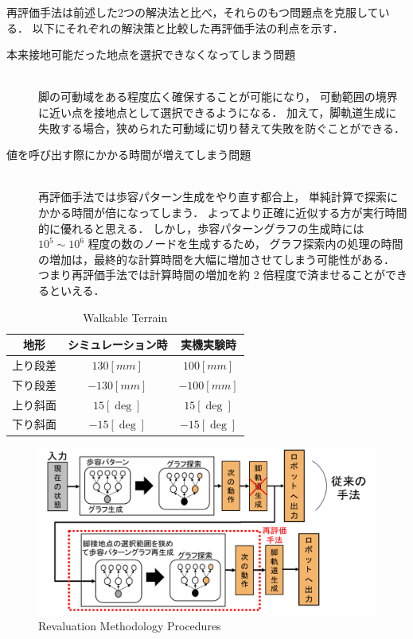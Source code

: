 再評価手法は前述した2つの解決法と比べ，それらのもつ問題点を克服している．
以下にそれぞれの解決策と比較した再評価手法の利点を示す．

\begin{description}
  \item[本来接地可能だった地点を選択できなくなってしまう問題]\mbox{}\\
    脚の可動域をある程度広く確保することが可能になり，
    可動範囲の境界に近い点を接地点として選択できるようになる．
    加えて，脚軌道生成に失敗する場合，狭められた可動域に切り替えて失敗を防ぐことができる．
    \\
  \item[値を呼び出す際にかかる時間が増えてしまう問題]\mbox{}\\
    再評価手法では歩容パターン生成をやり直す都合上，
    単純計算で探索にかかる時間が倍になってしまう．
    よってより正確に近似する方が実行時間的に優れると思える．
    しかし，歩容パターングラフの生成時には $10^5 \sim 10^6$ 程度の数のノードを生成するため，
    グラフ探索内の処理の時間の増加は，最終的な計算時間を大幅に増加させてしまう可能性がある．
    つまり再評価手法では計算時間の増加を約 2 倍程度で済ませることができるといえる．
\end{description}

\begin{table}[h]
	\caption{Walkable Terrain}
	\label{tab:walkable_terrain}  %
	\begin{center}
   	\begin{tabular}{|c|c|c|} \hline  %
      地形 & シミュレーション時 & 実機実験時 \\ \hline  %
      上り段差 & $130 [mm]$ & $100 [mm]$ \\ \hline  %
      下り段差 & $-130 [mm]$ & $-100 [mm]$\\ \hline  %
      上り斜面 & $15 [\deg]$ & $15 [\deg]$ \\ \hline  %
      下り斜面 & $-15 [\deg]$ & $-15 [\deg]$ \\ \hline  %
    \end{tabular}
  \end{center}
\end{table}

\begin{figure}[h]
  \begin{center}
    \includegraphics[width=140mm, clip]{figure/chapter2/revaluation_method.png}
    \caption{Revaluation Methodology Procedures}
    \label{fig:revaluation_methodolgy} %
  \end{center}
\end{figure}
